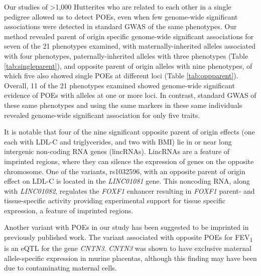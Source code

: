 Our studies of \textgreater1,000 Hutterites who are related to each other in a single pedigree allowed us to detect POEs, even when few genome-wide significant associations were detected in standard GWAS of the same phenotypes. Our method revealed parent of origin specific genome-wide significant associations for seven of the 21 phenotypes examined, with maternally-inherited alleles associated with four phenotypes, paternally-inherited alleles with three phenotypes (Table \ref{tab:singleparent}), and opposite parent of origin alleles with nine phenotypes, of which five also showed single POEs at different loci (Table \ref{tab:oppparent}). Overall, 11 of the 21 phenotypes examined showed genome-wide significant evidence of POEs with alleles at one or more loci. In contrast, standard GWAS of these same phenotypes and using the same markers in these same individuals revealed genome-wide significant association for only five traits. 

It is notable that four of the nine significant opposite parent of origin effects (one each with LDL-C and triglycerides, and two with BMI) lie in or near long intergenic non-coding RNA genes (lincRNAs). LincRNAs are a feature of imprinted regions\cite{Peters2014}, where they can silence the expression of genes on the opposite chromosome\cite{Barlow:2014dv,Patten:2016cb}. One of the variants, rs1032596, with an opposite parent of origin effect on LDL-C is located in the \emph{LINC01081} gene. This noncoding RNA, along with \emph{LINC01082}, regulates the \emph{FOXF1} enhancer resulting in \emph{FOXF1} parent- and tissue-specific activity\cite{Szafranski:2016fz} providing experimental support for tissue specific expression, a feature of imprinted regions. 

Another variant with POEs in our study has been suggested to be imprinted in previously published work. The variant associated with opposite POEs for FEV\textsubscript{1} is an eQTL for the gene \emph{CNTN3}. \emph{CNTN3} was shown to have exclusive maternal allele-specific expression in murine placentas\cite{Brideau:2010gz}, although this finding may have been due to contaminating maternal cells\cite{Okae:2011hj,Proudhon:2011eh}. 

